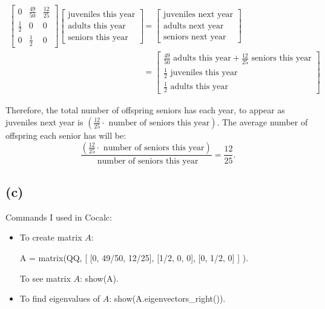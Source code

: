 \documentclass[10pt]{article}
\begin{document}
\begin{align*}
    \begin{bmatrix}
        0 & \frac{49}{50} & \frac{12}{25} \\
        \frac{1}{2} & 0 & 0 \\
        0 & \frac{1}{2} & 0
    \end{bmatrix}
    \begin{bmatrix}
        \text{juveniles this year} \\
        \text{adults this year} \\
        \text{seniors this year}
    \end{bmatrix} &= 
    \begin{bmatrix}
        \text{juveniles next year} \\
        \text{adults next year} \\
        \text{seniors next year}
    \end{bmatrix}\\ &=
    \begin{bmatrix}
        \frac{49}{50} \text{ adults this year} + \frac{12}{25} \text{ seniors this year} \\
        \frac{1}{2} \text{ juveniles this year} \\
        \frac{1}{2} \text{ adults this year}
    \end{bmatrix}.
\end{align*}

\noindent Therefore, the total number of offspring seniors has each year, to appear as juveniles next year is $\left(\frac{12}{25}\cdot \text{ number of seniors this year}\right)$. The average number of offspring each senior has will be:
$$\frac{\left(\frac{12}{25}\cdot \text{ number of seniors this year}\right)}{\text{ number of seniors this year}} = \frac{12}{25}.$$




\subsection*{(c)}
\noindent Commands I used in Cocalc:
\begin{itemize}
    \item To create matrix $A$: \par
    A = matrix(QQ, [
    [0, 49/50, 12/25],
    [1/2, 0, 0],
    [0, 1/2, 0] ] ). \par
    To see matrix $A$: show(A).
    \item To find eigenvalues of $A$: show(A.eigenvectors\_right()).
\end{itemize}
\end{document}
